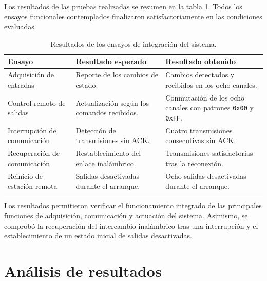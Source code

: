 Los resultados de las pruebas realizadas se resumen en la tabla \ref{tab:resultados_integracion}. Todos los ensayos funcionales contemplados finalizaron satisfactoriamente en las condiciones evaluadas.

\begin{table}[H]
	\centering
	\caption{Resultados de los ensayos de integración del sistema.}
	\small
	\renewcommand{\arraystretch}{1.2}
	\begin{tabular}{
			>{\raggedright\arraybackslash}p{}
			>{\raggedright\arraybackslash}p{}
			>{\raggedright\arraybackslash}p{}
		}
		\toprule
		\textbf{Ensayo} & \textbf{Resultado esperado} & \textbf{Resultado obtenido} \\
		\midrule
		Adquisición de entradas
		& Reporte de los cambios de estado.
		& Cambios detectados y recibidos en los ocho canales. \\
		
		Control remoto de salidas
		& Actualización según los comandos recibidos.
		& Conmutación de los ocho canales con patrones \texttt{0x00} y \texttt{0xFF}. \\
		
		Interrupción de comunicación
		& Detección de transmisiones sin ACK.
		& Cuatro transmisiones consecutivas sin ACK. \\
		
		Recuperación de comunicación
		& Restablecimiento del enlace inalámbrico.
		& Transmisiones satisfactorias tras la reconexión. \\
		
		Reinicio de estación remota
		& Salidas desactivadas durante el arranque.
		& Ocho salidas desactivadas durante el arranque. \\
		\bottomrule
	\end{tabular}
	\label{tab:resultados_integracion}
\end{table}

Los resultados permitieron verificar el funcionamiento integrado de las principales funciones de adquisición, comunicación y actuación del sistema. Asimismo, se comprobó la recuperación del intercambio inalámbrico tras una interrupción y el establecimiento de un estado inicial de salidas desactivadas.

\section{Análisis de resultados}

